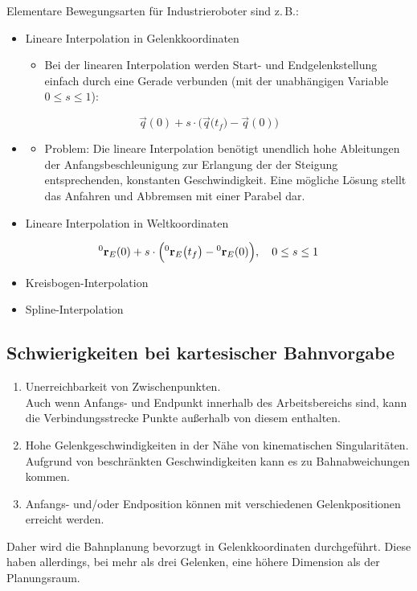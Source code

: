		Elementare Bewegungsarten für Industrieroboter sind z.\,B.:
		\begin{itemize}
			\item Lineare Interpolation in Gelenkkoordinaten
				\begin{itemize}
					\item Bei der linearen Interpolation werden Start- und Endgelenkstellung einfach durch eine Gerade verbunden (mit der unabhängigen Variable \( 0 \leq s \leq 1 \)):
				\end{itemize}
		\end{itemize}
		\begin{equation*}
			\vec{q}(0) + s \cdot \Big( \vec{q}\big(t_f\big) - \vec{q}(0) \Big)
		\end{equation*}
		\begin{itemize}
			\item[]
				\begin{itemize}
					\item Problem: Die lineare Interpolation benötigt unendlich hohe Ableitungen der Anfangsbeschleunigung zur Erlangung der der Steigung entsprechenden, konstanten Geschwindigkeit. Eine mögliche Lösung stellt das Anfahren und Abbremsen mit einer Parabel dar.
				\end{itemize}
			\item Lineare Interpolation in Weltkoordinaten
		\end{itemize}
		\begin{equation*}
			\prescript{0}{}{\vec{r}}_E(0) + s \cdot \Big(\! \prescript{0}{}{\vec{r}}_E \big(t_f\big) - \prescript{0}{}{\vec{r}}_E(0) \Big),\quad 0 \leq s \leq 1
		\end{equation*}
		\begin{itemize}
			\item Kreisbogen-Interpolation
			\item Spline-Interpolation
		\end{itemize}

		\subsection{Schwierigkeiten bei kartesischer Bahnvorgabe}
			\begin{enumerate}
				\item Unerreichbarkeit von Zwischenpunkten. \\ Auch wenn Anfangs- und Endpunkt innerhalb des Arbeitsbereichs sind, kann die Verbindungsstrecke Punkte außerhalb von diesem enthalten.
				\item Hohe Gelenkgeschwindigkeiten in der Nähe von kinematischen Singularitäten. \\ Aufgrund von beschränkten Geschwindigkeiten kann es zu Bahnabweichungen kommen.
				\item Anfangs- und/oder Endposition können mit verschiedenen Gelenkpositionen erreicht werden.
			\end{enumerate}
			Daher wird die Bahnplanung bevorzugt in Gelenkkoordinaten durchgeführt. Diese haben allerdings, bei mehr als drei Gelenken, eine höhere Dimension als der Planungsraum.

